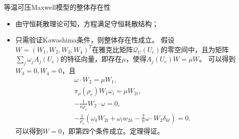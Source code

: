 \documentclass[mathserif]{beamer}
\begin{document}
\begin{frame}{等温可压Maxwell模型的整体存在性}
\begin{itemize}
	\item<2-> 由守恒耗散理论可知，方程满足守恒耗散结构；
	\item<3-> 只需验证Kawashima条件，则整体存在性成立。
	假设$W = (W_1,W_2,W_3,W_4)^T$在雅克比矩阵$\mathcal{Q}_U(U_e)$的零空间中，且为矩阵$\sum_j \omega_j A_j(U_e)$的特征向量，即存在$\mu$，使得$A_j(U_e) W = \mu W$。
可以得到$W_3=0,W_4=0$，且
	\begin{eqnarray*}
		\omega \cdot W_2 = \mu W_1, \\ 
		\pi_{\rho}(\rho_e) W_1 \omega_{i} =\mu W_{2i}, \\
		-\frac{1}{n \rho_e} W_2 \cdot \omega  = 0, \\
		-\frac{1}{\rho_e} (\omega_{k}  W_{2l} +  \omega_{l} w_{2k} - \frac{2}{n} \omega \cdot W_2 \delta_{kl}) = 0.
	\end{eqnarray*}
	可以得到$W=0$，即第四个条件成立。定理得证。
\end{itemize}

\end{frame}
\end{document}
